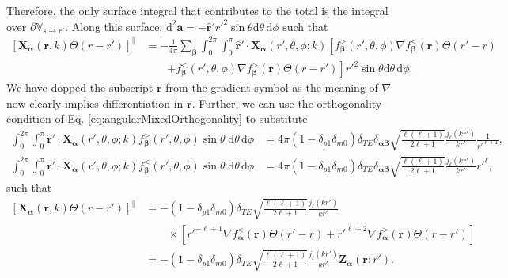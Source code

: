 \documentclass{article}
\begin{document}
Therefore, the only surface integral that contributes to the total is the integral over $\partial\mathbb{V}_{s\to r'}$. Along this surface, $\mathrm{d}^2\mathbf{a} = -\hat{\mathbf{r}}'r'^2\sin\theta\mathrm{d}\theta\,\mathrm{d}\phi$ such that
\begin{equation}
\begin{split}
\left[\mathbf{X}_{\bm{\alpha}}(\mathbf{r},k)\Theta(r - r')\right]^\parallel &= 
-\frac{1}{4\pi}\sum_{\bm{\beta}} \int_0^{2\pi}\int_0^\pi\hat{\mathbf{r}}'\cdot\mathbf{X}_{\bm{\alpha}}(r',\theta,\phi;k) \left[f_{\bm{\beta}}^>(r',\theta,\phi)\nabla f_{\bm{\beta}}^<(\mathbf{r})\Theta(r' - r)\right.\\
&\qquad\left.+ f_{\bm{\beta}}^<(r',\theta,\phi)\nabla f_{\bm{\beta}}^>(\mathbf{r})\Theta(r - r')\right]r'^2\sin\theta\mathrm{d}\theta\,\mathrm{d}\phi.
\end{split}
\end{equation}
We have dopped the subscript $\mathbf{r}$ from the gradient symbol as the meaning of $\nabla$ now clearly implies differentiation in $\mathbf{r}$. Further, we can use the orthogonality condition of Eq. \eqref{eq:angularMixedOrthogonality} to substitute
\begin{equation}
\begin{split}
\int_0^{2\pi}\int_0^\pi\hat{\mathbf{r}}'\cdot\mathbf{X}_{\bm{\alpha}}(r',\theta,\phi;k)f_{\bm{\beta}}^>(r',\theta,\phi)\sin\theta\;\mathrm{d}\theta\,\mathrm{d}\phi &= 4\pi(1 - \delta_{p1}\delta_{m0})\delta_{TE}\delta_{\bm{\alpha}\bm{\beta}}\sqrt{\frac{\ell(\ell + 1)}{2\ell + 1}}\frac{j_\ell(kr')}{kr'}\frac{1}{r'^{\ell + 1}},\\
\int_0^{2\pi}\int_0^\pi\hat{\mathbf{r}}'\cdot\mathbf{X}_{\bm{\alpha}}(r',\theta,\phi;k)f_{\bm{\beta}}^<(r',\theta,\phi)\sin\theta\;\mathrm{d}\theta\,\mathrm{d}\phi &= 4\pi(1 - \delta_{p1}\delta_{m0})\delta_{TE}\delta_{\bm{\alpha}\bm{\beta}}\sqrt{\frac{\ell(\ell + 1)}{2\ell + 1}}\frac{j_\ell(kr')}{kr'}r'^\ell,
\end{split}
\end{equation}
such that
\begin{equation}
\begin{split}
\left[\mathbf{X}_{\bm{\alpha}}(\mathbf{r},k)\Theta(r - r')\right]^\parallel &= -(1 - \delta_{p1}\delta_{m0})\delta_{TE}\sqrt{\frac{\ell(\ell + 1)}{2\ell + 1}}\frac{j_\ell(kr')}{kr'}\\
&\qquad\times\left[r'^{-\ell + 1}\nabla f_{\bm{\alpha}}^<(\mathbf{r})\Theta(r' - r) + r'^{\ell + 2}\nabla f_{\bm{\alpha}}^>(\mathbf{r})\Theta(r - r')\right]\\[0.5em]
&= -(1 - \delta_{p1}\delta_{m0})\delta_{TE}\sqrt{\frac{\ell(\ell + 1)}{2\ell + 1}}\frac{j_\ell(kr')}{kr'}\mathbf{Z}_{\bm{\alpha}}(\mathbf{r};r').
\end{split}
\end{equation}
\end{document}
